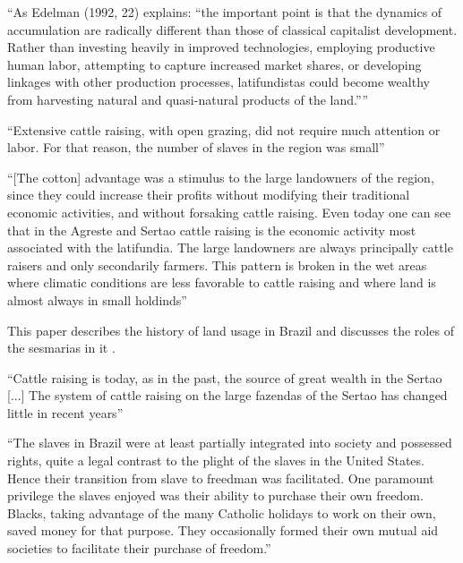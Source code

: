 \documentclass{article}
\begin{document}
\parencite{Carlson2019-mk}
``As Edelman (1992, 22) explains: “the important point is that the dynamics of accumulation are 
radically different than those of classical capitalist development. Rather than investing heavily in improved  technologies,  employing  productive  human  labor,  attempting  to  capture  increased  market  shares,  or   developing linkages with other production processes, latifundistas could become wealthy from harvesting  natural and quasi-natural products of the land.”''

\textcite{Diegues_Junior1959-ba}



\textcite[p.~113]{De_Oliveira_Andrade1980-xz}
``Extensive cattle raising, with open grazing, did not require much attention or labor. For that reason, the number of slaves in the region was small''

\textcite[p.~119]{De_Oliveira_Andrade1980-xz}
``[The cotton] advantage was a stimulus to the large landowners of the region, since they could increase their profits without modifying their traditional economic activities, and without forsaking cattle raising. Even today one can see that in the Agreste and Sertao cattle raising is the economic activity most associated with the latifundia. The large landowners are always principally cattle raisers and only secondarily farmers. This pattern is broken in the wet areas where climatic conditions are less favorable to cattle raising and where land is almost always in small holdinds''

This paper describes the history of land usage in Brazil and discusses the roles of the sesmarias in it \parencite{Reydon2015-ff}.

\textcite[p.~157]{De_Oliveira_Andrade1980-xz}
``Cattle raising is today, as in the past, the source of great wealth in the Sertao [...] The system of cattle raising on the large fazendas of the Sertao has changed little in recent years''

``The slaves in Brazil were at least partially integrated into society and possessed rights, quite a legal contrast to the plight of the slaves in the United States. Hence their transition from slave to freedman was facilitated. One paramount privilege the slaves enjoyed was their ability to purchase their own freedom. Blacks, taking advantage of the many Catholic holidays to work on their own, saved money for that purpose. They occasionally formed their own mutual aid societies to facilitate their purchase of freedom.''
\end{document}
